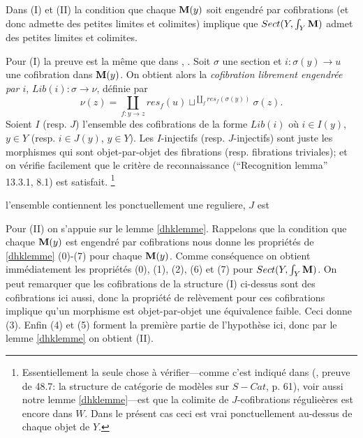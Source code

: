 \documentclass[12pt]{article}
\newcommand{\mm}{{\bf M}}
\begin{document}
Dans (I) et (II) la condition que chaque $\mm (y)$ soit engendr\'e par
cofibrations (et
donc admette des petites limites et colimites) implique que
$Sect (Y,\int
_Y\mm )$ admet des petites limites et colimites.


Pour (I) la preuve est la m\^eme que dans \cite{Hirschhorn},
\cite{DHK}.
Soit $\sigma$ une section et $i: \sigma (y)\rightarrow u$ une cofibration dans
$\mm (y)$. On obtient alors la {\em cofibration librement engendr\'ee par $i$},
$Lib(i): \sigma \rightarrow \nu$, d\'efinie par
$$
\nu (z) = \coprod _{f: y\rightarrow z} res_f(u) \sqcup ^{\coprod_{f}
res_f(\sigma (y))}\sigma (z).
$$
Soient  $I$ (resp. $J$) l'ensemble des cofibrations
de la forme $Lib(i)$ o\`u $i\in I(y)$, $y\in Y$ (resp. $i\in J(y)$, $y\in
Y$).
Les $I$-injectifs (resp.
$J$-injectifs) sont juste les morphismes qui sont objet-par-objet des fibrations
(resp. fibrations triviales); et on v\'erifie facilement que le crit\`ere de
reconnaissance  (``Recognition lemma'' \cite{Hirschhorn} 13.3.1, \cite{DHK} 8.1)
est satisfait. \footnote{Essentiellement la
seule chose \`a v\'erifier---comme c'est indiqu\'e dans
(\cite{DHK}, preuve de 48.7: la structure de cat\'egorie de mod\`eles sur
$S-Cat$, p. 61), voir aussi notre lemme \ref{dhklemme}---est que la colimite de
$J$-cofibrations r\'egulie\`eres est encore dans $W$.  Dans le pr\'esent cas
ceci est
vrai ponctuellement au-dessus de chaque objet de $Y$.}

l'ensemble
contiennent les
ponctuellement une
reguliere,
$J$ est

Pour (II) on s'appuie sur le lemme \ref{dhklemme}. Rappelons que la
condition que chaque $\mm (y)$
est engendr\'e par cofibrations nous donne les propri\'et\'es de
\ref{dhklemme} (0)-(7) pour chaque
$\mm (y)$.  Comme  cons\'equence on obtient imm\'ediatement les
propri\'et\'es (0), (1), (2),
(6) et (7) pour $Sect (Y,\int
_Y\mm )$.  On peut remarquer que les cofibrations de la structure (I)
ci-dessus sont des
cofibrations ici aussi, donc la propri\'et\'e de rel\`evement pour ces
cofibrations  implique qu'un
morphisme est objet-par-objet une \'equivalence faible.  Ceci donne (3).
Enfin (4) et (5) forment
la premi\`ere partie de l'hypoth\`ese ici, donc par le lemme \ref{dhklemme}
on obtient (II).
\end{document}
